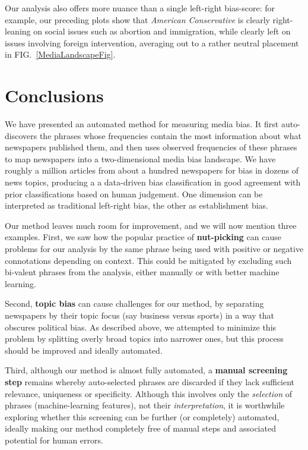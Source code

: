 \documentclass[10pt,letterpaper]{article}
\def\fig#1{FIG.~\ref{#1}}
\begin{document}
Our analysis also offers more nuance than a single left-right bias-score: for example, our preceding plots show that 
{\it American Conservative} is clearly right-leaning on social issues such as abortion and immigration, while clearly left on issues involving foreign intervention, averaging out to a rather neutral placement in \fig{MediaLandscapeFig}.





\section*{Conclusions}

We have presented an automated method for measuring media bias. 
It first auto-discovers the phrases whose frequencies contain the most information about what newspapers published them, and then uses observed frequencies of these phrases to map newspapers into a two-dimensional media bias landscape. 
We have roughly a million articles from about a hundred newspapers for bias in dozens of news topics, producing a 
a data-driven bias classification in good agreement with prior classifications based on human judgement. One dimension can be interpreted as traditional left-right bias, the other as establishment bias.

Our method leaves much room for improvement, and we will now mention three examples.
First, we saw how the popular practice of {\bf nut-picking} can cause problems for our analysis by the same phrase being used with positive or negative connotations depending on context. This could be mitigated by excluding such bi-valent phrases from the analysis, either manually or with better machine learning.

Second, {\bf topic bias} can cause challenges for our method, by separating newspapers by their topic focus (say business versus sports) in a way that obscures political bias. As described above, we attempted to minimize this problem by splitting overly broad topics into narrower ones, but this process should be improved and ideally automated.


Third, although our method is almost fully automated, a {\bf manual screening step} remains whereby auto-selected phrases are discarded if they lack sufficient relevance, uniqueness or specificity. Although this involves only the {\it selection} of phrases (machine-learning features), not their {\it interpretation}, it is worthwhile exploring whether this screening can be further (or completely) automated, ideally making our method completely free of manual steps and associated potential for human errors.
\end{document}
